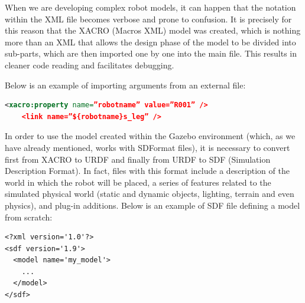 When we are developing complex robot models, it can happen that the notation within the XML file becomes verbose and prone to confusion.
It is precisely for this reason that the XACRO (Macros XML) model was created, which is nothing more than an XML  that allows the design phase of the model to be divided into sub-parts, which are then imported one by one into the main file. 
This results in cleaner code reading and facilitates debugging.

Below is an example of importing arguments from an external file:
\begin{lstlisting}[language=XML]
    <xacro:property name=”robotname” value=”R001” />
    <link name=”${robotname}s_leg” />
\end{lstlisting}
In order to use the model created within the Gazebo environment (which, as we have already mentioned, works with SDFormat files), it is necessary to convert first from XACRO to URDF and finally from URDF to SDF (Simulation Description Format). In fact, files with this format include a description of the world in which the robot will be placed, a series of features related to the simulated physical world (static and dynamic objects, lighting, terrain and even physics), and plug-in additions.
Below is an example of SDF file defining a model from scratch:
\begin{lstlisting}
<?xml version='1.0'?>
<sdf version='1.9'>
  <model name='my_model'>
    ...
  </model>
</sdf>
\end{lstlisting}





